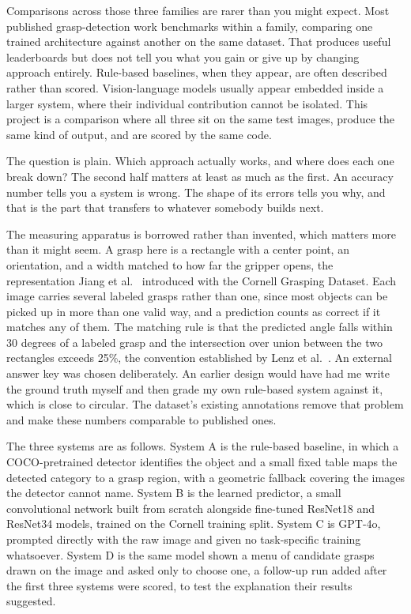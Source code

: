 \documentclass[12pt,letterpaper]{article}
\begin{document}
Comparisons across those three families are rarer than you might
expect. Most published grasp-detection work benchmarks within a family,
comparing one trained architecture against another on the same dataset.
That produces useful leaderboards but does not tell you what you gain
or give up by changing approach entirely. Rule-based baselines, when
they appear, are often described rather than scored. Vision-language
models usually appear embedded inside a larger system, where their
individual contribution cannot be isolated. This project is a
comparison where all three sit on the same test images, produce the
same kind of output, and are scored by the same code.

The question is plain. Which approach actually works, and where does
each one break down? The second half matters at least as much as the
first. An accuracy number tells you a system is wrong. The shape of its
errors tells you why, and that is the part that transfers to whatever
somebody builds next.

The measuring apparatus is borrowed rather than invented, which matters
more than it might seem. A grasp here is a rectangle with a center
point, an orientation, and a width matched to how far the gripper
opens, the representation Jiang et al.~\cite{jiang2011} introduced with the Cornell
Grasping Dataset. Each image carries several labeled grasps
rather than one, since most objects can be picked up in more than one
valid way, and a prediction counts as correct if it matches any of
them. The matching rule is that the predicted angle falls within 30
degrees of a labeled grasp and the intersection over union between the
two rectangles exceeds 25\%, the convention established by Lenz et al.~\cite{lenz2015}. An external answer key was chosen deliberately. An earlier
design would have had me write the ground truth myself and then grade
my own rule-based system against it, which is close to circular. The
dataset's existing annotations remove that problem and make these
numbers comparable to published ones.

The three systems are as follows. System A is the rule-based baseline,
in which a COCO-pretrained detector identifies the object and a small
fixed table maps the detected category to a grasp region, with a
geometric fallback covering the images the detector cannot name. System
B is the learned predictor, a small convolutional network built from
scratch alongside fine-tuned ResNet18 and ResNet34 models, trained on
the Cornell training split. System C is GPT-4o, prompted directly with
the raw image and given no task-specific training whatsoever. System D
is the same model shown a menu of candidate grasps drawn on the image
and asked only to choose one, a follow-up run added after the first
three systems were scored, to test the explanation their results
suggested.
\end{document}
